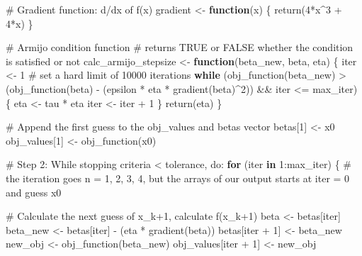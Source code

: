 \documentclass[
  letterpaper,
  DIV=11,
  numbers=noendperiod]{scrartcl}
\newenvironment{Shaded}{\begin{snugshade}}{\end{snugshade}}
\newcommand{\CommentTok}[1]{\textcolor[rgb]{0.37,0.37,0.37}{#1}}
\newcommand{\ControlFlowTok}[1]{\textcolor[rgb]{0.00,0.23,0.31}{\textbf{#1}}}
\newcommand{\DecValTok}[1]{\textcolor[rgb]{0.68,0.00,0.00}{#1}}
\newcommand{\FunctionTok}[1]{\textcolor[rgb]{0.28,0.35,0.67}{#1}}
\newcommand{\NormalTok}[1]{\textcolor[rgb]{0.00,0.23,0.31}{#1}}
\newcommand{\OtherTok}[1]{\textcolor[rgb]{0.00,0.23,0.31}{#1}}
\newcommand{\SpecialCharTok}[1]{\textcolor[rgb]{0.37,0.37,0.37}{#1}}
\begin{document}
\begin{Shaded}
\begin{Highlighting}[]
  \CommentTok{\# Gradient function: d/dx of f(x)}
\NormalTok{  gradient }\OtherTok{\textless{}{-}} \ControlFlowTok{function}\NormalTok{(x) \{}
    \FunctionTok{return}\NormalTok{(}\DecValTok{4}\SpecialCharTok{*}\NormalTok{x}\SpecialCharTok{\^{}}\DecValTok{3} \SpecialCharTok{+} \DecValTok{4}\SpecialCharTok{*}\NormalTok{x)}
\NormalTok{  \}}
  
  \CommentTok{\# Armijo condition function}
  \CommentTok{\# returns TRUE or FALSE whether the condition is satisfied or not}
\NormalTok{  calc\_armijo\_stepsize }\OtherTok{\textless{}{-}} \ControlFlowTok{function}\NormalTok{(beta\_new, beta, eta) \{}
\NormalTok{    iter }\OtherTok{\textless{}{-}} \DecValTok{1} \CommentTok{\# set a hard limit of 10000 iterations}
    \ControlFlowTok{while}\NormalTok{ (}\FunctionTok{obj\_function}\NormalTok{(beta\_new) }\SpecialCharTok{\textgreater{}}\NormalTok{ (}\FunctionTok{obj\_function}\NormalTok{(beta) }\SpecialCharTok{{-}}\NormalTok{ (epsilon }\SpecialCharTok{*}\NormalTok{ eta }\SpecialCharTok{*} \FunctionTok{gradient}\NormalTok{(beta)}\SpecialCharTok{\^{}}\DecValTok{2}\NormalTok{)) }\SpecialCharTok{\&\&}\NormalTok{ iter }\SpecialCharTok{\textless{}=}\NormalTok{ max\_iter) \{}
\NormalTok{      eta }\OtherTok{\textless{}{-}}\NormalTok{ tau }\SpecialCharTok{*}\NormalTok{ eta}
\NormalTok{      iter }\OtherTok{\textless{}{-}}\NormalTok{ iter }\SpecialCharTok{+} \DecValTok{1}
\NormalTok{    \}}
    \FunctionTok{return}\NormalTok{(eta)}
\NormalTok{  \}}
  
  \CommentTok{\# Append the first guess to the obj\_values and betas vector}
\NormalTok{  betas[}\DecValTok{1}\NormalTok{] }\OtherTok{\textless{}{-}}\NormalTok{ x0}
\NormalTok{  obj\_values[}\DecValTok{1}\NormalTok{] }\OtherTok{\textless{}{-}} \FunctionTok{obj\_function}\NormalTok{(x0)}
  
  \CommentTok{\# Step 2: While stopping criteria \textless{} tolerance, do:}
  \ControlFlowTok{for}\NormalTok{ (iter }\ControlFlowTok{in} \DecValTok{1}\SpecialCharTok{:}\NormalTok{max\_iter) \{ }\CommentTok{\# the iteration goes n = 1, 2, 3, 4, but the arrays of our output starts at iter = 0 and guess x0}
    
    \CommentTok{\# Calculate the next guess of x\_k+1, calculate f(x\_k+1)}
\NormalTok{    beta }\OtherTok{\textless{}{-}}\NormalTok{ betas[iter]}
\NormalTok{    beta\_new }\OtherTok{\textless{}{-}}\NormalTok{ betas[iter] }\SpecialCharTok{{-}}\NormalTok{ (eta }\SpecialCharTok{*} \FunctionTok{gradient}\NormalTok{(beta))}
\NormalTok{    betas[iter }\SpecialCharTok{+} \DecValTok{1}\NormalTok{] }\OtherTok{\textless{}{-}}\NormalTok{ beta\_new}
\NormalTok{    new\_obj }\OtherTok{\textless{}{-}} \FunctionTok{obj\_function}\NormalTok{(beta\_new)}
\NormalTok{    obj\_values[iter }\SpecialCharTok{+} \DecValTok{1}\NormalTok{] }\OtherTok{\textless{}{-}}\NormalTok{ new\_obj}
    

\end{Highlighting}
\end{Shaded}
\end{document}
